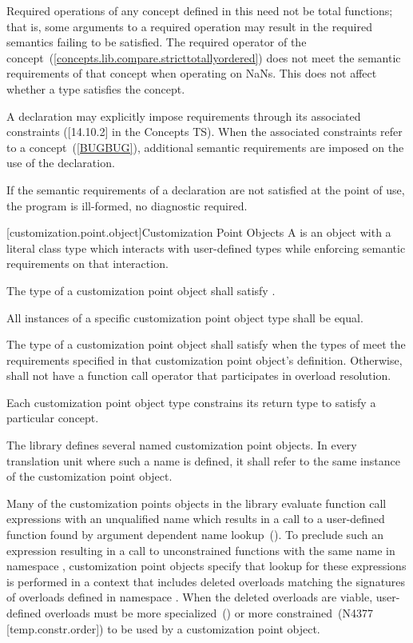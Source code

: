 {\color{newclr}
\pnum
Required operations of any concept defined in this  need not be
total functions; that is, some arguments to a required operation may
result in the required semantics failing to be satisfied. \enterexample
The required \tcode{<} operator of the 
concept~(\ref{concepts.lib.compare.stricttotallyordered}) does not meet the
semantic requirements of that concept when operating on NaNs.\exitexample
This does not affect whether a type satisfies the concept.

\pnum
A declaration may explicitly impose requirements through its associated
constraints ([14.10.2] in the Concepts TS). When the associated constraints
refer to a concept~(\ref{BUGBUG}), additional semantic requirements are
imposed on the use of the declaration.

\pnum
If the semantic requirements of a declaration are not satisfied at the
point of use, the program is ill-formed, no diagnostic required.
}

\setcounter{section}{5}
\setcounter{subsection}{2}
\setcounter{subsubsection}{1}
\setcounter{paragraph}{4}

{\color{newclr}
[customization.point.object]{Customization Point Objects}
\pnum
A  is an object with a
literal class type which interacts with user-defined types while
enforcing semantic requirements on that interaction.

\pnum
The type of a customization point object shall satisfy
.

\pnum
All instances of a specific customization point object type shall
be equal.

\pnum
The type of a customization point object  shall satisfy
 when the types of
 meet the requirements specified in that
customization point object's definition. Otherwise, 
shall not have a function call operator that participates in
overload resolution.

\pnum
Each customization point object type constrains its return type
to satisfy a particular concept.

\pnum
The library defines several named customization point objects.
In every translation unit where such a name is defined, it shall
refer to the same instance of the customization point object.

\pnum
\enternote Many of the customization points objects in the library
evaluate function call expressions with an unqualified name which
results in a call to a user-defined function found by argument
dependent name lookup~(). To preclude
such an expression resulting in a call to unconstrained functions
with the same name in namespace , customization point
objects specify that lookup for these expressions is performed in
a context that includes deleted overloads matching the signatures
of overloads defined in namespace . When the deleted
overloads are viable, user-defined overloads must be more
specialized~() or more
constrained~(N4377 [temp.constr.order])  to be used by a
customization point object. \exitnote
} %
